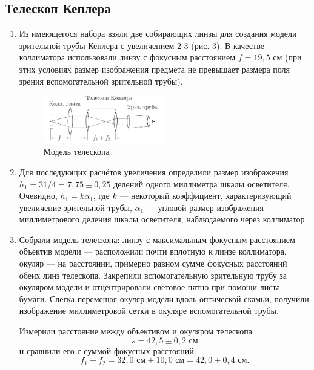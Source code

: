 \documentclass[a4paper, 12pt]{article}%
\begin{document}
	\subsection{Телескоп Кеплера}
	\begin{enumerate}
		\item Из имеющегося набора взяли две собирающих линзы для создания модели
		зрительной трубы Кеплера с увеличением 2-3 (рис. 3). В качестве коллиматора использовали линзу с фокусным расстоянием $f = 19{,}5$ см (при этих
		условиях размер изображения предмета не превышает размера поля
		зрения вспомогательной зрительной трубы).
											
		\begin{figure}
			\begin{center}
				\includegraphics[width = 0.5\textwidth]{pic/412-3.png}
				\caption{Модель телескопа}
			\end{center}
		\end{figure}
		
		\item Для последующих расчётов увеличения определили размер изображения $h_1 = 31/4 =7{,}75\pm0{,}25$ делений одного миллиметра шкалы осветителя. Очевидно, $h_1 = k\alpha_1$, где $k$ --- некоторый коэффициент, характеризующий увеличение зрительной трубы, $\alpha_1$ --- угловой размер изображения миллиметрового деления шкалы осветителя, наблюдаемого через коллиматор.
		
		\item Собрали модель телескопа: линзу с максимальным фокусным расстоянием --- объектив модели --- расположили почти вплотную к линзе коллиматора, окуляр --- на расстоянии, примерно равном сумме фокусных расстояний обеих линз телескопа.
		Закрепили вспомогательную зрительную трубу за окуляром модели и отцентрировали световое пятно при помощи листа бумаги. Слегка перемещая окуляр модели вдоль оптической скамьи, получили изображение миллиметровой сетки в окуляре вспомогательной трубы.
		
		Измерили расстояние между объективом и окуляром телескопа 
		\begin{equation*}
		s = 42{,}5\pm0{,}2\text{ см}
		\end{equation*}
		и сравнили его с суммой фокусных расстояний:
		\begin{equation*}
			f_1+f_2 = 32{,}0\text{ см} + 10{,}0\text{ см} = 42{,}0\pm0{,}4\text{ см}.
		\end{equation*}
		

\end{enumerate}
\end{document}
